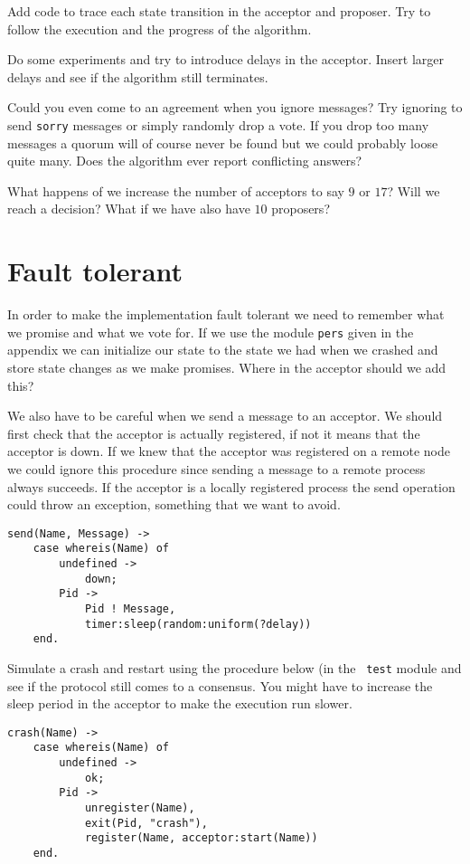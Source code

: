 \documentclass[a4paper,11pt]{article}
\begin{document}
Add code to trace each state transition in the acceptor and
proposer. Try to follow the execution and the progress of the
algorithm. 

Do some experiments and try to introduce delays in the
acceptor. Insert larger delays and see if the algorithm still
terminates.

Could you even come to an agreement when you ignore messages? Try
ignoring to send {\tt sorry} messages or simply randomly drop a
vote. If you drop too many messages a quorum will of course never be
found but we could probably loose quite many. Does the algorithm ever
report conflicting answers?

What happens of we increase the number of acceptors to say $9$ or
$17$? Will we reach a decision? What if we have also have $10$
proposers?


\section{Fault tolerant}

In order to make the implementation fault tolerant we need to
remember what we promise and what we vote for. If we use the module
{\tt pers} given in the appendix we can initialize our state to the
state we had when we crashed and store state changes as we make promises.
Where in the acceptor should we add this? 

We also have to be careful when we send a message to an acceptor. We
should first check that the acceptor is actually registered, if not it
means that the acceptor is down. If we knew that the acceptor was
registered on a remote node we could ignore this procedure since
sending a message to a remote process always succeeds. If the acceptor
is a locally registered process the send operation could throw an
exception, something that we want to avoid.

\begin{verbatim}
send(Name, Message) ->
    case whereis(Name) of 
        undefined ->
            down; 
        Pid -> 
            Pid ! Message,
            timer:sleep(random:uniform(?delay))
    end.
\end{verbatim}

Simulate a crash and restart using the procedure below (in the {\tt
  test} module and see if the protocol still comes to a
  consensus. You might have to increase the sleep period in the
  acceptor to make the execution run slower.

\begin{verbatim}
crash(Name) ->    
    case whereis(Name) of 
        undefined ->
            ok;
        Pid ->
            unregister(Name),
            exit(Pid, "crash"),
            register(Name, acceptor:start(Name))
    end.
\end{verbatim}
\end{document}
